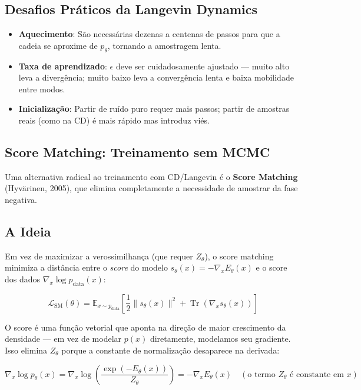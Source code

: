 \documentclass{tufte-handout}
\let\subsubsection\subsection
\begin{document}
\subsubsection{Desafios Práticos da Langevin Dynamics}

\begin{itemize}
    \item \textbf{Aquecimento}: São necessárias dezenas a centenas de passos para que a cadeia se aproxime de $p_\theta$, tornando a amostragem lenta.
    \item \textbf{Taxa de aprendizado}: $\epsilon$ deve ser cuidadosamente ajustado --- muito alto leva a divergência; muito baixo leva a convergência lenta e baixa mobilidade entre modos.
    \item \textbf{Inicialização}: Partir de ruído puro requer mais passos; partir de amostras reais (como na CD) é mais rápido mas introduz viés.
\end{itemize}

\subsection{Score Matching: Treinamento sem MCMC}

Uma alternativa radical ao treinamento com CD/Langevin é o \textbf{Score Matching} (Hyvärinen, 2005), que elimina completamente a necessidade de amostrar da fase negativa.

\subsubsection{A Ideia}

Em vez de maximizar a verossimilhança (que requer $Z_\theta$), o score matching minimiza a distância entre o \textit{score} do modelo $s_\theta(x) = -\nabla_x E_\theta(x)$ e o score dos dados $\nabla_x \log p_{\text{data}}(x)$:

\begin{equation}
\mathcal{L}_{\text{SM}}(\theta) = \mathbb{E}_{x \sim p_{\text{data}}} \left[ \frac{1}{2} \| s_\theta(x) \|^2 + \operatorname{Tr}(\nabla_x s_\theta(x)) \right]
\end{equation}

O score é uma função vetorial que aponta na direção de maior crescimento da densidade --- em vez de modelar $p(x)$ diretamente, modelamos seu gradiente. Isso elimina $Z_\theta$ porque a constante de normalização desaparece na derivada:

\begin{equation}
\nabla_x \log p_\theta(x) = \nabla_x \log \left( \frac{\exp(-E_\theta(x))}{Z_\theta} \right) = -\nabla_x E_\theta(x) \quad (\text{o termo } Z_\theta \text{ é constante em } x)
\end{equation}
\end{document}
